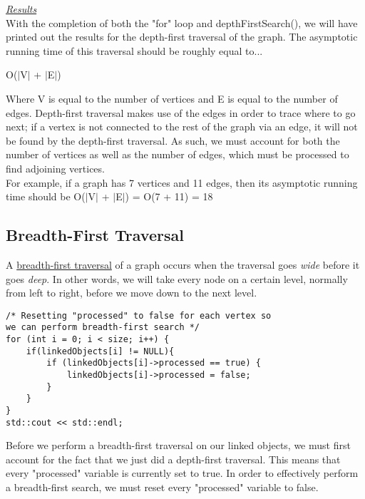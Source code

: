 \documentclass{article}
\begin{document}
\underline{\textit{Results}} \\
With the completion of both the "for" loop and depthFirstSearch(), we will have printed out the results for the depth-first traversal of the graph. The asymptotic running time of this traversal should be roughly equal to... 
\begin{center}
    O($|$V$|$ + $|$E$|$)
\end{center}
Where V is equal to the number of vertices and E is equal to the number of edges. Depth-first traversal makes use of the edges in order to trace where to go next; if a vertex is not connected to the rest of the graph via an edge, it will not be found by the depth-first traversal. As such, we must account for both the number of vertices as well as the number of edges, which must be processed to find adjoining vertices. \\
For example, if a graph has 7 vertices and 11 edges, then its asymptotic running time should be O($|$V$|$ + $|$E$|$) = O(7 + 11) = 18

\pagebreak

\subsection{Breadth-First Traversal}
A \underline{breadth-first traversal} of a graph occurs when the traversal goes \textit{wide} before it goes \textit{deep}. In other words, we will take every node on a certain level, normally from left to right, before we move down to the next level.
\begin{lstlisting}
/* Resetting "processed" to false for each vertex so 
we can perform breadth-first search */
for (int i = 0; i < size; i++) {
    if(linkedObjects[i] != NULL){
        if (linkedObjects[i]->processed == true) {
            linkedObjects[i]->processed = false;
        }
    }
}
std::cout << std::endl;
\end{lstlisting}
Before we perform a breadth-first traversal on our linked objects, we must first account for the fact that we just did a depth-first traversal. This means that every "processed" variable is currently set to true. In order to effectively perform a breadth-first search, we must reset every "processed" variable to false. 
\end{document}
